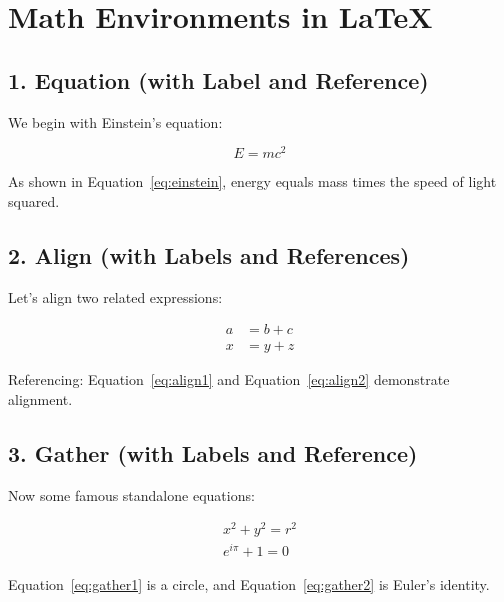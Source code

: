 \documentclass{article}
\begin{document}
\section*{Math Environments in LaTeX}

\subsection*{1. Equation (with Label and Reference)}
We begin with Einstein's equation:

\begin{equation}
  \label{eq:einstein}
  E = mc^2
\end{equation}

As shown in Equation~\eqref{eq:einstein}, energy equals mass times the speed of light squared.

\subsection*{2. Align (with Labels and References)}
Let's align two related expressions:

\begin{align}
  a &= b + c \label{eq:align1} \\
  x &= y + z \label{eq:align2}
\end{align}

Referencing: Equation~\eqref{eq:align1} and Equation~\eqref{eq:align2} demonstrate alignment.

\subsection*{3. Gather (with Labels and Reference)}
Now some famous standalone equations:

\begin{gather}
  x^2 + y^2 = r^2 \label{eq:gather1} \\
  e^{i\pi} + 1 = 0 \label{eq:gather2}
\end{gather}

Equation~\eqref{eq:gather1} is a circle, and Equation~\eqref{eq:gather2} is Euler’s identity.
\end{document}
